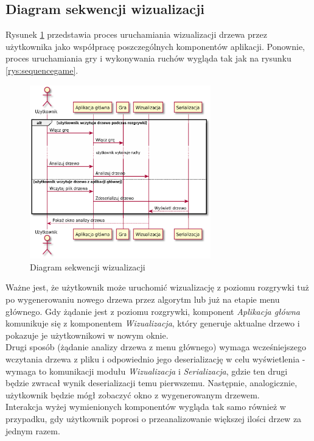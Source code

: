 \documentclass{article}
\newcommand{\modulename}[1]{\textit{#1}}
\begin{document}
	\subsection{Diagram sekwencji wizualizacji}
	Rysunek \ref{rys:sequencevisualise} przedstawia proces uruchamiania wizualizacji drzewa przez użytkownika jako współpracę poszczególnych komponentów aplikacji. Ponownie, proces uruchamiania gry i wykonywania ruchów wygląda tak jak na rysunku \ref{rys:sequencegame}. 
	\begin{figure}[h]
		\centering
		\includegraphics[width=0.7\textwidth]{visualization_sequence_simplified}
		\caption{Diagram sekwencji wizualizacji}
		\label{rys:sequencevisualise}
	\end{figure}

	\noindent Ważne jest, że użytkownik może uruchomić wizualizację z poziomu rozgrywki tuż po wygenerowaniu nowego drzewa przez algorytm lub już na etapie menu głównego. Gdy żądanie jest z poziomu rozgrywki, komponent \modulename{Aplikacja główna} komunikuje się z komponentem \modulename{Wizualizacja}, który generuje aktualne drzewo i pokazuje je użytkownikowi w nowym oknie. \\
	
	 \noindent Drugi sposób (żądanie analizy drzewa z menu głównego) wymaga wcześniejszego wczytania drzewa z pliku i odpowiednio jego deserializację w celu wyświetlenia - wymaga to komunikacji modułu \modulename{Wizualizacja} i \modulename{Serializacja}, gdzie ten drugi będzie zwracał wynik deserializacji temu pierwszemu. Następnie, analogicznie, użytkownik będzie mógł zobaczyć okno z wygenerowanym drzewem.\\
	 
	 \noindent Interakcja wyżej wymienionych komponentów wygląda tak samo również w przypadku, gdy użytkownik poprosi o przeanalizowanie większej ilości drzew za jednym razem.
	
\end{document}
